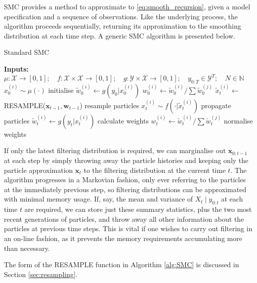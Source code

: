 \documentclass[fleqn]{article}
\begin{document}
SMC provides a method to approximate to \eqref{eq:smooth_recursion}, given a model specification and a sequence of observations. Like the underlying process, the algorithm proceeds sequentially, returning its approximation to the smoothing distribution at each time step.
A generic SMC algorithm is presented below.

\begin{algorithm}
	\caption{Standard SMC}\label{alg:SMC}
	\begin{algorithmic}[0]
    	\State \textbf{Inputs:} $\mu:\mathcal{X}\to[0,1];\quad f:\mathcal{X}\times\mathcal{X}\to[0,1];\quad g:\mathcal{Y}\times\mathcal{X}\to[0,1];\quad y_{0:T}\in\mathcal{Y}^T;\quad N\in\mathbb{N}$
			\State $x_0^{(i)} \sim \mu(\cdot)$ \Comment initialise
			\State $\tilde{w}_0^{(i)} \gets g(y_0 | x_0^{(i)})$
			\State $w_0^{(i)} \gets \tilde{w}_0^{(i)} / \sum \tilde{w}_0^{(j)}$
		\EndFor
        		\State $\tilde{x}_t^{(i)} \gets$ {\footnotesize RESAMPLE}($\mathbf{x}_{t-1}, \mathbf{w}_{t-1}$) \Comment resample particles
				\State $x_t^{(i)} \sim f(\cdot | \tilde{x}_t^{(i)})$ \Comment propagate particles
				\State $\tilde{w}_t^{(i)} \gets g(y_t | x_t^{(i)})$ \Comment calculate weights
				\State $w_t^{(i)} \gets \tilde{w}_t^{(i)} / \sum \tilde{w}_t^{(j)}$ \Comment normalise weights
        	\EndFor
        \EndFor
	\end{algorithmic}
\end{algorithm}

If only the latest filtering distribution is required, we can marginalise out $\mathbf{x}_{0:t-1}$ at each step by simply throwing away the particle histories and keeping only the particle approximation $\mathbf{x}_{t}$ to the filtering distribution at the current time $t$. 
The algorithm progresses in a Markovian fashion, only ever referring to the particles at the immediately previous step, so filtering distributions can be approximated with minimal memory usage. 
If, say, the mean and variance of $X_{t} \mid y_{0:t}$ at each time $t$ are required, we can store just these summary statistics, plus the two most recent generations of particles, and throw away all other information about the particles at previous time steps. This is vital if one wishes to carry out filtering in an on-line fashion, as it prevents the memory requirements accumulating more than necessary.

The form of the {\footnotesize RESAMPLE} function in Algorithm \ref{alg:SMC} is discussed in Section \ref{sec:resampling}.
\end{document}

